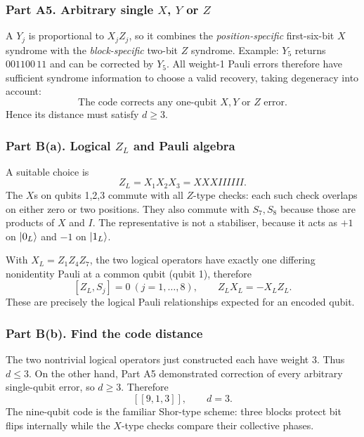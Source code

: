 \subsubsection*{Part A5. Arbitrary single $X$, $Y$ or $Z$}
A $Y_j$ is proportional to $X_jZ_j$, so it combines the \emph{position-specific} first-six-bit $X$ syndrome with the \emph{block-specific} two-bit $Z$ syndrome. Example: $Y_5$ returns $001100\,11$ and can be corrected by $Y_5$. All weight-1 Pauli errors therefore have sufficient syndrome information to choose a valid recovery, taking degeneracy into account:
\begin{equation}\boxed{\text{The code corrects any one-qubit }X,Y\text{ or }Z\text{ error.}}\end{equation}
Hence its distance must satisfy $d\ge3$.

\subsubsection*{Part B(a). Logical $Z_L$ and Pauli algebra}
A suitable choice is
\begin{equation}\boxed{Z_L=X_1X_2X_3=XXXIIIIII.}\end{equation}
The $X$s on qubits 1,2,3 commute with all $Z$-type checks: each such check overlaps on either zero or two positions. They also commute with $S_7,S_8$ because those are products of $X$ and $I$. The representative is not a stabiliser, because it acts as $+1$ on $\left\lvert 0_L\right\rangle$ and $-1$ on $\left\lvert 1_L\right\rangle$.

With $X_L=Z_1Z_4Z_7$, the two logical operators have exactly one differing nonidentity Pauli at a common qubit (qubit 1), therefore
\begin{equation}\boxed{[Z_L,S_j]=0\ (j=1,\ldots,8),\qquad Z_LX_L=-X_LZ_L.}\end{equation}
These are precisely the logical Pauli relationships expected for an encoded qubit.

\subsubsection*{Part B(b). Find the code distance}
The two nontrivial logical operators just constructed each have weight 3. Thus $d\le3$. On the other hand, Part A5 demonstrated correction of every arbitrary single-qubit error, so $d\ge3$. Therefore
\begin{equation}\boxed{[[9,1,3]],\qquad d=3.}\end{equation}
The nine-qubit code is the familiar Shor-type scheme: three blocks protect bit flips internally while the $X$-type checks compare their collective phases.

